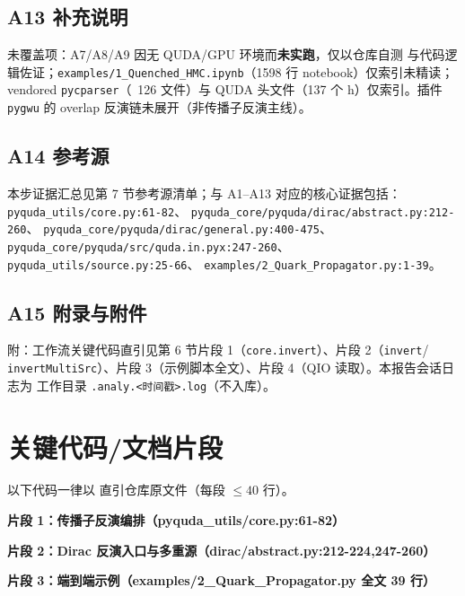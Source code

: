 \documentclass[UTF8]{ctexart}
\begin{document}
\subsection{A13 补充说明}
\textcolor{warn}{未覆盖项}：A7/A8/A9 因无 QUDA/GPU 环境而\textbf{未实跑}，仅以仓库自测
与代码逻辑佐证；\texttt{examples/1\_Quenched\_HMC.ipynb}（1598 行 notebook）仅索引未精读；
vendored \texttt{pycparser}（~126 文件）与 QUDA 头文件（137 个 h）仅索引。插件
\texttt{pygwu} 的 overlap 反演链未展开（非传播子反演主线）。

\subsection{A14 参考源}
本步证据汇总见第 7 节参考源清单；与 A1–A13 对应的核心证据包括：
\texttt{\nolinkurl{pyquda_utils/core.py:61-82}}、
\texttt{\nolinkurl{pyquda_core/pyquda/dirac/abstract.py:212-260}}、
\texttt{\nolinkurl{pyquda_core/pyquda/dirac/general.py:400-475}}、
\texttt{\nolinkurl{pyquda_core/pyquda/src/quda.in.pyx:247-260}}、
\texttt{\nolinkurl{pyquda_utils/source.py:25-66}}、
\texttt{\nolinkurl{examples/2_Quark_Propagator.py:1-39}}。

\subsection{A15 附录与附件}
附：工作流关键代码直引见第 6 节片段 1（\texttt{core.invert}）、片段 2（\texttt{invert}/
\texttt{invertMultiSrc}）、片段 3（示例脚本全文）、片段 4（QIO 读取）。本报告会话日志为
工作目录 \texttt{.analy.\textless 时间戳\textgreater.log}（不入库）。

\section{关键代码/文档片段}
以下代码一律以  直引仓库原文件（每段 $\le 40$ 行）。

\textbf{片段 1：传播子反演编排（pyquda\_utils/core.py:61-82）}


\textbf{片段 2：Dirac 反演入口与多重源（dirac/abstract.py:212-224,247-260）}



\textbf{片段 3：端到端示例（examples/2\_Quark\_Propagator.py 全文 39 行）}

\end{document}
